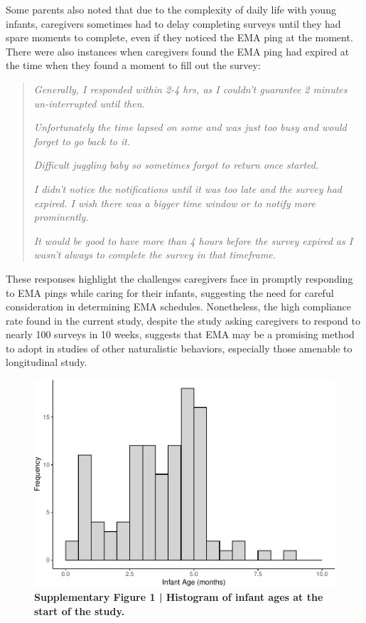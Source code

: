 \documentclass[
]{article}
\begin{document}
Some parents also noted that due to the complexity of daily life with
young infants, caregivers sometimes had to delay completing surveys
until they had spare moments to complete, even if they noticed the EMA
ping at the moment. There were also instances when caregivers found the
EMA ping had expired at the time when they found a moment to fill out
the survey:

\begin{quote}
\textit{Generally, I responded within 2-4 hrs, as I couldn't guarantee 2 minutes un-interrupted until then.}
  
\textit{Unfortunately the time lapsed on some and was just too busy and would forget to go back to it.}
  
\textit{Difficult juggling baby so sometimes forgot to return once started.}
  
\textit{I didn’t notice the notifications until it was too late and the survey had expired. I wish there was a bigger time window or to notify more prominently.}
  
\textit{It would be good to have more than 4 hours before the survey expired as I wasn't always to complete the survey in that timeframe.}
  
\end{quote}

These responses highlight the challenges caregivers face in promptly
responding to EMA pings while caring for their infants, suggesting the
need for careful consideration in determining EMA schedules.
Nonetheless, the high compliance rate found in the current study,
despite the study asking caregivers to respond to nearly 100 surveys in
10 weeks, suggests that EMA may be a promising method to adopt in
studies of other naturalistic behaviors, especially those amenable to
longitudinal study.

\begin{figure}[p]

{\centering \includegraphics[width=1\linewidth,]{MIPH_childdev_files/figure-latex/supp figure 1-1} 

}

\caption{\textbf{Supplementary Figure 1 | Histogram of infant ages at the start of the study.}}\label{fig:supp figure 1}
\end{figure}
\end{document}
